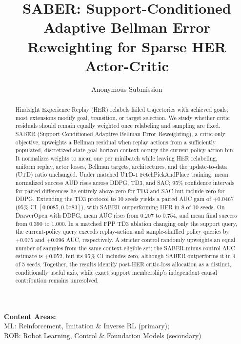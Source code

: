 \documentclass[letterpaper]{article}
\title{SABER: Support-Conditioned Adaptive Bellman Error Reweighting for Sparse HER Actor-Critic}
\author{Anonymous Submission}
\begin{document}
\maketitle

\begin{center}
\small\textbf{Content Areas:}\\
ML: Reinforcement, Imitation \& Inverse RL (primary);\\
ROB: Robot Learning, Control \& Foundation Models (secondary)
\end{center}

\begin{abstract}
Hindsight Experience Replay (HER) relabels failed trajectories with achieved goals; most extensions modify goal, transition, or target selection. We study whether critic residuals should remain equally weighted once relabeling and sampling are fixed. SABER (Support-Conditioned Adaptive Bellman Error Reweighting), a critic-only objective, upweights a Bellman residual when replay actions from a sufficiently populated, discretized state-goal-horizon context occupy the current-policy action bin. It normalizes weights to mean one per minibatch while leaving HER relabeling, uniform replay, actor losses, Bellman targets, architectures, and the update-to-data (UTD) ratio unchanged. Under matched UTD-1 FetchPickAndPlace training, mean normalized success AUD rises across DDPG, TD3, and SAC; 95\% confidence intervals for paired differences lie entirely above zero for TD3 and SAC but include zero for DDPG. Extending the TD3 protocol to 10 seeds yields a paired AUC gain of \(+0.0467\) (95\% CI \([0.0085, 0.0783]\)), with SABER outperforming HER in 8 of 10 seeds. On DrawerOpen with DDPG, mean AUC rises from \(0.207\) to \(0.754\), and mean final success from \(0.390\) to \(1.000\). In a matched FPP TD3 ablation changing only the support query, the current-policy query exceeds replay-action and sample-shuffled policy queries by \(+0.075\) and \(+0.096\) AUC, respectively. A stricter control randomly upweights an equal number of samples from  the same context-eligible set; the SABER-minus-control AUC estimate is \(+0.052\), but its 95\% CI includes zero, although SABER outperforms it in 4 of 5 seeds. Together, the results identify post-HER critic-loss allocation as a distinct, conditionally useful axis, while exact support membership's independent causal contribution remains unresolved.
\end{abstract}
\end{document}
